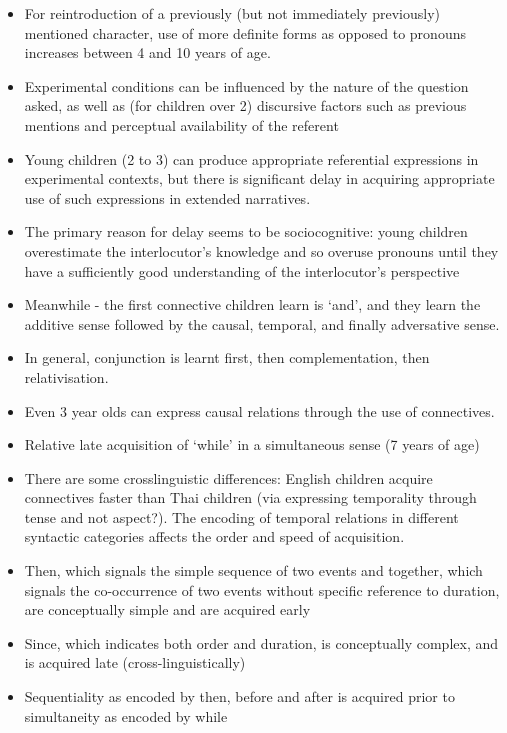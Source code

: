 \documentclass{article}
\begin{document}
\begin{itemize}
    \item For reintroduction of a previously (but not immediately previously) mentioned character, use of more definite forms as opposed to pronouns increases between 4 and 10 years of age.
    \item Experimental conditions can be influenced by the nature of the question asked, as well as (for children over 2) discursive factors such as previous mentions and perceptual availability of the referent
    \item Young children (2 to 3) can produce appropriate referential expressions in experimental contexts, but there is significant delay in acquiring appropriate use of such expressions in extended narratives.
    \item The primary reason for delay seems to be sociocognitive: young children overestimate the interlocutor's knowledge and so overuse pronouns until they have a sufficiently good understanding of the interlocutor's perspective
    \item Meanwhile - the first connective children learn is `and', and they learn the additive sense followed by the causal, temporal, and finally adversative sense.
    \item In general, conjunction is learnt first, then complementation, then relativisation.
    \item Even 3 year olds can express causal relations through the use of connectives. 
    \item Relative late acquisition of `while' in a simultaneous sense (7 years of age)
    \item There are some crosslinguistic differences: English children acquire connectives faster than Thai children (via expressing temporality through tense and not aspect?). The encoding of temporal relations in different syntactic categories affects the order and speed of acquisition.
    \item Then, which signals the simple sequence of two events and together, which signals the co-occurrence of two events without specific reference to duration, are conceptually simple and are acquired early
    \item Since, which indicates both order and duration, is conceptually complex, and is acquired late (cross-linguistically)
    \item Sequentiality as encoded by then, before and after is acquired prior to simultaneity as encoded by while
\end{itemize}
\end{document}
